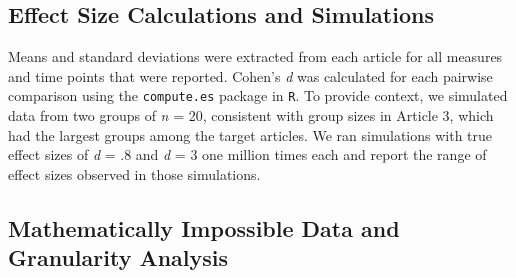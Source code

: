 \documentclass[
  english,
  man, donotrepeattitle,floatsintext]{apa7}
\begin{document}
\hypertarget{effect-size-calculations-and-simulations}{%
\subsection{Effect Size Calculations and Simulations}\label{effect-size-calculations-and-simulations}}

Means and standard deviations were extracted from each article for all measures and time points that were reported. Cohen's \emph{d} was calculated for each pairwise comparison using the \texttt{compute.es} package in \texttt{R}. To provide context, we simulated data from two groups of \emph{n} = 20, consistent with group sizes in Article 3, which had the largest groups among the target articles. We ran simulations with true effect sizes of \emph{d} = .8 and \emph{d} = 3 one million times each and report the range of effect sizes observed in those simulations.

\hypertarget{mathematically-impossible-data-and-granularity-analysis}{%
\subsection{Mathematically Impossible Data and Granularity Analysis}\label{mathematically-impossible-data-and-granularity-analysis}}
\end{document}
